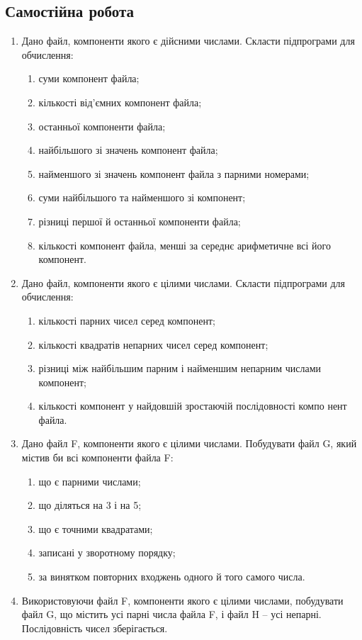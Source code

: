 \documentclass[]{article}
\makeatletter
\newcommand{\xslalph}[1]{\expandafter\@xslalph\csname c@#1\endcsname}
\newcommand{\@xslalph}[1]{%
    \ifcase#1\or а\or б\or в\or г\or д\or e\or є\or ж\or з\or i%
    \or й\or к\or л\or м\or н\or о\or п\or р\or с\or т%
    \or у\or ф\or х\or ц\or ч\or ш\or ю\or я\or аа\or бб\or вв %
    \else\@ctrerr\fi%
}
\makeatother
\begin{document}
 \subsection{Самостійна робота}
\begin{enumerate}
\def\labelenumi{\arabic{enumi}.}
\item   Дано файл, компоненти якого є дійсними числами. Скласти підпрограми для обчислення: 
\begin{enumerate}[label=\xslalph*)]
\item
 суми компонент файла;  
\item кількості від'ємних компонент файла;  
\item останньої компоненти файла; 
\item найбільшого зі значень компонент файла; 
\item найменшого зі значень компонент файла з парними номерами;
\item суми найбільшого та найменшого зі компонент; 
\item різниці першої й останньої компоненти файла; 
\item  кількості  компонент файла,  менші  за  середнє  арифметичне  всі
його компонент. 
\end{enumerate}
\item   Дано файл, компоненти якого є цілими числами. Скласти підпрограми для обчислення: 
\begin{enumerate}[label=\xslalph*)]
\item кількості парних чисел серед компонент; 
\item кількості квадратів непарних чисел серед компонент; 
\item різниці між найбільшим парним і найменшим непарним числами 
компонент; 
\item  кількості  компонент  у найдовшій  зростаючій послідовності  компо
нент файла.
\end{enumerate}
\item   Дано файл F,  компоненти  якого  є  цілими  числами. Побудувати 
файл G, який містив би всі компоненти файла F: 
\begin{enumerate}[label=\xslalph*)]
\item що є парними числами;   \item що діляться на 3 і на 5; 
\item що є точними квадратами;        \item записані у зворотному порядку; 
\item за винятком повторних входжень одного й того самого числа. 
\end{enumerate}
\item   Використовуючи файл F,  компоненти  якого  є  цілими  числами, 
побудувати файл G, що містить усі парні числа файла F, і файл H – усі 
непарні. Послідовність чисел зберігається. 


\end{enumerate}
\end{document}
